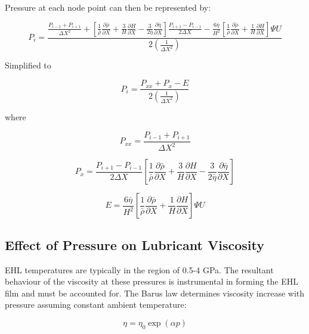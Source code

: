 Pressure at each node point can then be represented by:

\begin{equation}\label{eq3.19}
	P_i=\frac{\frac{P_{i-1}+P_{i+1}}{\Delta X^2}+\left[\frac{1}{\bar{\rho}} \frac{\partial \bar{\rho}}{\partial X}+\frac{3}{H} \frac{\partial H}{\partial X}-\frac{3}{2 \bar{\eta}} \frac{\partial \bar{\eta}}{\partial X}\right] \frac{P_{i+1}-P_{i-1}}{2 \Delta X}-\frac{6 \bar{\eta}}{H^2}\left[\frac{1}{\bar{\rho}} \frac{\partial \bar{\rho}}{\partial X}+\frac{1}{H} \frac{\partial H}{\partial X}\right] \Psi U}{2\left(\frac{1}{\Delta X^2}\right)}
\end{equation}

Simplified to 

\begin{equation}\label{eq3.20}
	P_i=\frac{P_{x x}+P_x-E}{2\left(\frac{1}{\Delta X^2}\right)}
\end{equation}

where

\begin{equation}\label{eq3.21}
	P_{x x}=\frac{P_{i-1}+P_{i+1}}{\Delta X^2}
\end{equation}

\begin{equation}\label{eq3.22}
	P_{x}=\frac{P_{i+1}-P_{i-1}}{2 \Delta X}\left[\frac{1}{\bar{\rho}} \frac{\partial \bar{\rho}}{\partial X}+\frac{3}{H} \frac{\partial H}{\partial X}-\frac{3}{2 \bar{\eta}} \frac{\partial \bar{\eta}}{\partial X}\right]
\end{equation}

\begin{equation}\label{eq3.23}
	E=\frac{6 \bar{\eta}}{H^2}\left[\frac{1}{\bar{\rho}} \frac{\partial \bar{\rho}}{\partial X}+\frac{1}{H} \frac{\partial H}{\partial X}\right] \Psi U
\end{equation}

\subsection{Effect of Pressure on Lubricant Viscosity}

EHL temperatures are typically in the region of 0.5-4 GPa. The resultant behaviour of the viscosity at these pressures is instrumental in forming the EHL film and must be accounted for. The Barus law \cite{Barus1893} determines viscosity increase with pressure assuming constant ambient temperature: 

\begin{equation}\label{eq3.24}
	\eta=\eta_0 \exp (\alpha p)
\end{equation}

